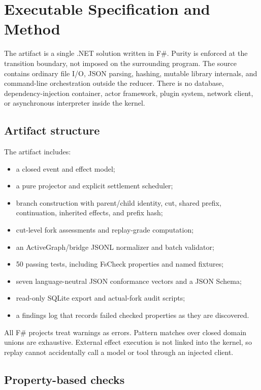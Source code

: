 \section{Executable Specification and Method}
\label{sec:method}

The artifact is a single .NET solution written in F\#.  Purity is enforced at
the transition boundary, not imposed on the surrounding program.  The source
contains ordinary file I/O, JSON parsing, hashing, mutable library internals,
and command-line orchestration outside the reducer.  There is no database,
dependency-injection container, actor framework, plugin system, network client,
or asynchronous interpreter inside the kernel.

\subsection{Artifact structure}

The artifact includes:

\begin{itemize}[leftmargin=*]
  \item a closed event and effect model;
  \item a pure projector and explicit settlement scheduler;
  \item branch construction with parent/child identity, cut, shared prefix,
  continuation, inherited effects, and prefix hash;
  \item cut-level fork assessments and replay-grade computation;
  \item an ActiveGraph/bridge JSONL normalizer and batch validator;
  \item 50 passing tests, including FsCheck properties and named fixtures;
  \item seven language-neutral JSON conformance vectors and a JSON Schema;
  \item read-only SQLite export and actual-fork audit scripts;
  \item a findings log that records failed checked properties as they are
  discovered.
\end{itemize}

All F\# projects treat warnings as errors.  Pattern matches over closed domain
unions are exhaustive.  External effect execution is not linked into the
kernel, so replay cannot accidentally call a model or tool through an injected
client.

\subsection{Property-based checks}

